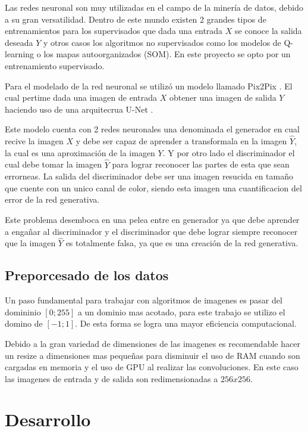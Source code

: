 \documentclass[]{IEEEtran}
\begin{document}
    Las redes neuronal son muy utilizadas en el campo de la minería de datos, debido a 
    su gran versatilidad. Dentro de este mundo existen 2 grandes tipos de entrenamientos 
    para los supervisados que dada una entrada $X$ se conoce la salida deseada $Y$ y 
    otros casos los algoritmos no supervisados como los modelos de Q-learning o los mapas autoorganizados (SOM).
    En este proyecto se opto por un entrenamiento supervisado.

    Para el modelado de la red neuronal se utilizó un modelo llamado Pix2Pix \cite{Pix2Pix}.
    El cual pertime dada una imagen de entrada $X$ obtener una imagen de salida $Y$ haciendo uso 
    de una arquitecrua U-Net \cite{U-Net}. 
    
    Este modelo cuenta con 2 redes neuronales una denominada 
    el generador en cual recive la imagen $X$ y debe ser capaz de aprender a transformala en la imagen $\hat{Y}$, la cual es 
    una aproximación de la imagen $Y$.
    Y por otro lado el discriminador el cual debe tomar la imagen $\hat{Y}$ para lograr reconocer las partes de 
    esta que sean errorneas. La salida del discriminador debe ser una imagen resucida en tamaño que cuente con 
    un unico canal de color, siendo esta imagen una cuantificacion del error de la red generativa.

    Este problema desemboca en una pelea entre en generador ya que debe aprender a engañar al discriminador 
    y el discriminador que debe lograr siempre reconocer que la imagen $\hat{Y}$ es totalmente falsa, ya que es una 
    creación de la red generativa.

    \subsection{Preporcesado de los datos}

    Un paso fundamental para trabajar con algoritmos de imagenes es pasar del domininio $[0;255]$ a 
    un dominio mas acotado, para este trabajo se utilizo el domino de $[-1;1]$. De esta forma se logra 
    una mayor eficiencia computacional.

    Debido a la gran variedad de dimensiones de las imagenes es recomendable hacer un resize a dimensiones mas pequeñas 
    para disminuir el uso de RAM cuando son cargadas en memoria y el uso de GPU al realizar las convoluciones. En 
    este caso las imagenes de entrada y de salida son redimensionadas a $256x256$.

    \section{Desarrollo}
\end{document}
